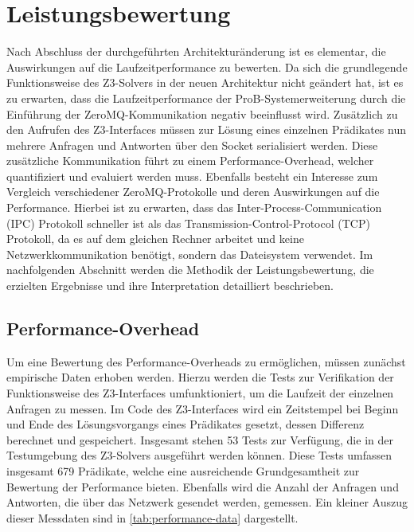 \section{Leistungsbewertung}
\label{sec:performance-evaluation}

Nach Abschluss der durchgeführten Architekturänderung ist es elementar, die Auswirkungen auf die Laufzeitperformance zu bewerten.
Da sich die grundlegende Funktionsweise des Z3-Solvers in der neuen Architektur nicht geändert hat,
ist es zu erwarten, dass die Laufzeitperformance der ProB-Systemerweiterung durch die Einführung der ZeroMQ-Kommunikation negativ beeinflusst wird.
Zusätzlich zu den Aufrufen des Z3-Interfaces müssen zur Lösung eines einzelnen Prädikates nun mehrere Anfragen und Antworten über den Socket serialisiert werden.
Diese zusätzliche Kommunikation führt zu einem Performance-Overhead, welcher quantifiziert und evaluiert werden muss.
Ebenfalls besteht ein Interesse zum Vergleich verschiedener ZeroMQ-Protokolle und deren Auswirkungen auf die Performance.
Hierbei ist zu erwarten, dass das Inter-Process-Communication (IPC) Protokoll schneller ist als das Transmission-Control-Protocol (TCP) Protokoll,
da es auf dem gleichen Rechner arbeitet und keine Netzwerkkommunikation benötigt, sondern das Dateisystem verwendet.
Im nachfolgenden Abschnitt werden die Methodik der Leistungsbewertung,
die erzielten Ergebnisse und ihre Interpretation detailliert beschrieben.

\subsection{Performance-Overhead}

Um eine Bewertung des Performance-Overheads zu ermöglichen, müssen zunächst empirische Daten erhoben werden.
Hierzu werden die Tests zur Verifikation der Funktionsweise des Z3-Interfaces umfunktioniert, um die Laufzeit der einzelnen Anfragen zu messen.
Im Code des Z3-Interfaces wird ein Zeitstempel bei Beginn und Ende des Lösungsvorgangs eines Prädikates gesetzt, dessen Differenz berechnet und gespeichert.
Insgesamt stehen 53 Tests zur Verfügung, die in der Testumgebung des Z3-Solvers ausgeführt werden können.
Diese Tests umfassen insgesamt 679 Prädikate, welche eine ausreichende Grundgesamtheit zur Bewertung der Performance bieten.
Ebenfalls wird die Anzahl der Anfragen und Antworten, die über das Netzwerk gesendet werden, gemessen.
Ein kleiner Auszug dieser Messdaten sind in \cref{tab:performance-data} dargestellt.


